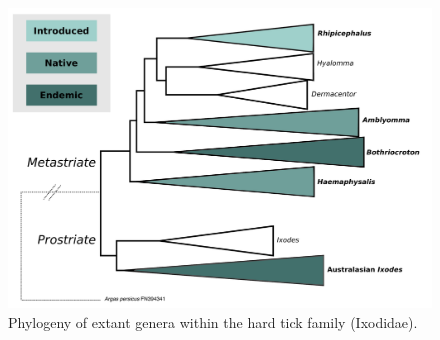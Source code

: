 \documentclass[a4paper, nobind]{templates/ociamthesis}
\begin{document}
\begin{figure}
\includegraphics[width=0.95\linewidth]{figures/ms-figs/Ch1-treeixod} \caption[Phylogeny of hard tick genera (Ixodidae)]{Phylogeny of extant genera within the hard tick family (Ixodidae).}\label{fig:F1treeixod}
\end{figure}
\end{document}
